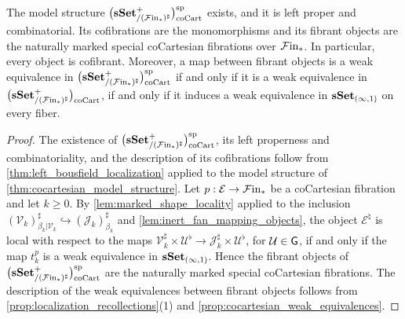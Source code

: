 \documentclass[10pt,reqno]{amsart}
\begin{document}
\begin{theorem}
\label{thm:enriched_special_model_structure}
The model structure $\bigl(\mathbf{sSet}^+_{/(\mathcal{F}\mathrm{in}_*)^\sharp}\bigr)_{\mathrm{coCart}}^{\mathrm{sp}}$ exists, and it is left proper and
combinatorial. Its cofibrations are the monomorphisms and its fibrant
objects are the naturally marked special coCartesian fibrations over
$\mathcal{F}\mathrm{in}_*$. In particular, every object is cofibrant. Moreover, a map
between fibrant objects is a weak equivalence in $\bigl(\mathbf{sSet}^+_{/(\mathcal{F}\mathrm{in}_*)^\sharp}\bigr)_{\mathrm{coCart}}^{\mathrm{sp}}$ if and
only if it is a weak equivalence in $\bigl(\mathbf{sSet}^+_{/(\mathcal{F}\mathrm{in}_*)^\sharp}\bigr)_{\mathrm{coCart}}$, if and only if it
induces a weak equivalence in $\mathbf{sSet}_{(\infty,1)}$ on every fiber.
\end{theorem}

\begin{proof}
The existence of $\bigl(\mathbf{sSet}^+_{/(\mathcal{F}\mathrm{in}_*)^\sharp}\bigr)_{\mathrm{coCart}}^{\mathrm{sp}}$, its left properness and
combinatoriality, and the description of its cofibrations follow from
\cref{thm:left_bousfield_localization} applied to the model structure
of \cref{thm:cocartesian_model_structure}. Let
$p:\mathcal E\to\mathcal{F}\mathrm{in}_*$ be a coCartesian fibration and let
$k\geq0$. By \cref{lem:marked_shape_locality} applied to the
inclusion
$(\mathcal V_k)^\sharp_{\beta_k|\mathcal V_k}\hookrightarrow
(\mathcal J_k)^\sharp_{\beta_k}$ and
\cref{lem:inert_fan_mapping_objects}, the object
$\mathcal E^\natural$ is local with respect to the maps
$\mathcal V_k^\sharp\times\mathcal U^\flat\to
\mathcal J_k^\sharp\times\mathcal U^\flat$, for
$\mathcal U\in\mathsf G$, if and only if the map $t_k^p$ is a weak
equivalence in $\mathbf{sSet}_{(\infty,1)}$. Hence the fibrant objects of
$\bigl(\mathbf{sSet}^+_{/(\mathcal{F}\mathrm{in}_*)^\sharp}\bigr)_{\mathrm{coCart}}^{\mathrm{sp}}$ are the naturally marked special coCartesian fibrations.
The description of the weak equivalences between fibrant objects
follows from \cref{prop:localization_recollections}(1) and
\cref{prop:cocartesian_weak_equivalences}.
\end{proof}
\end{document}
